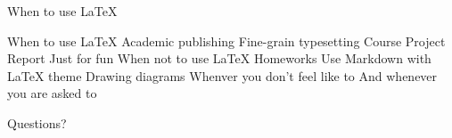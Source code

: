 \documentclass[scheme=plain,aspectratio=169]{ctexbeamer}
\let\OriginLaTeX\LaTeX
\renewcommand\LaTeX{\textrm{\OriginLaTeX\xspace}}
\begin{document}
\begin{frame}{When to use \LaTeX}
    \begin{outline}
        \1 When to use \LaTeX
            \2 Academic publishing
            \2 Fine-grain typesetting
                \3 Course Project Report
            \2 Just for fun
        \1 When not to use \LaTeX
            \2 Homeworks
                \3 Use Markdown with LaTeX theme
            \2 Drawing diagrams
            \2 Whenver you don't feel like to
            \2 And whenever you are asked to
    \end{outline}
\end{frame}

\begin{frame}[standout]
    Questions?
\end{frame}
\end{document}
